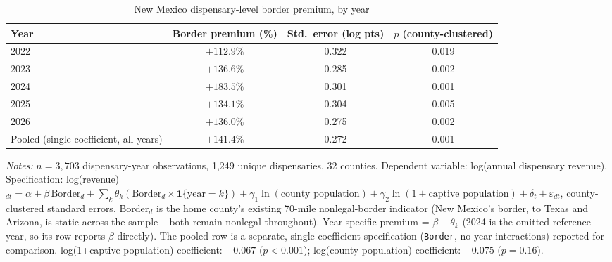\begin{table}[htbp]
\centering
\caption{New Mexico dispensary-level border premium, by year}
\label{tab:nm_dispensary_eventstudy}
\footnotesize
\begin{tabular}{lccc}
\toprule
Year & Border premium (\%) & Std.\ error (log pts) & $p$ (county-clustered) \\
\midrule
2022 & $+112.9\%$ & 0.322 & 0.019 \\
2023 & $+136.6\%$ & 0.285 & 0.002 \\
2024 & $+183.5\%$ & 0.301 & 0.001 \\
2025 & $+134.1\%$ & 0.304 & 0.005 \\
2026 & $+136.0\%$ & 0.275 & 0.002 \\
\midrule
Pooled (single coefficient, all years) & $+141.4\%$ & 0.272 & 0.001 \\
\bottomrule
\end{tabular}
\begin{minipage}{0.9\textwidth}
\vspace{0.3em}
\footnotesize
\textit{Notes:} $n=3{,}703$ dispensary-year observations, 1{,}249 unique dispensaries, 32 counties. Dependent
variable: log(annual dispensary revenue). Specification: log(revenue)$_{dt} = \alpha + \beta\,\text{Border}_d +
\sum_k \theta_k(\text{Border}_d \times \mathbf{1}\{\text{year}=k\}) + \gamma_1\ln(\text{county
population}) + \gamma_2\ln(1+\text{captive population}) + \delta_t + \varepsilon_{dt}$, county-clustered
standard errors. Border$_d$ is the home county's existing 70-mile nonlegal-border indicator (New Mexico's
border, to Texas and Arizona, is static across the sample -- both remain nonlegal throughout). Year-specific
premium = $\beta + \theta_k$ (2024 is the omitted reference year, so its row reports $\beta$ directly). The
pooled row is a separate, single-coefficient specification (\texttt{Border}, no year interactions) reported for
comparison. log(1+captive population) coefficient: $-0.067$ ($p<0.001$); log(county population) coefficient:
$-0.075$ ($p=0.16$).
\end{minipage}
\end{table}
